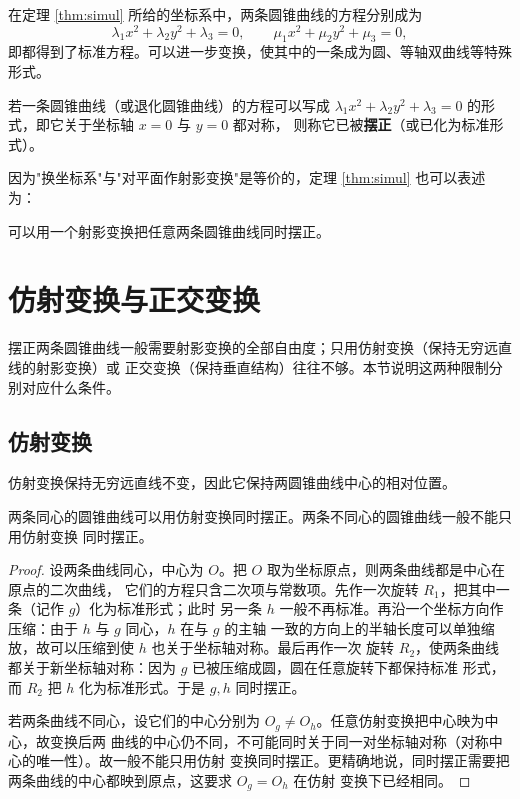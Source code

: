 \begin{corollary}[摆正]
在定理 \ref{thm:simul} 所给的坐标系中，两条圆锥曲线的方程分别成为
\[
\lambda_1x^2+\lambda_2y^2+\lambda_3=0,\qquad
\mu_1x^2+\mu_2y^2+\mu_3=0,
\]
即都得到了标准方程。可以进一步变换，使其中的一条成为圆、等轴双曲线等特殊形式。
\end{corollary}

\begin{definition}
若一条圆锥曲线（或退化圆锥曲线）的方程可以写成
$\lambda_1x^2+\lambda_2y^2+\lambda_3=0$ 的形式，即它关于坐标轴 $x=0$ 与 $y=0$ 都对称，
则称它已被\textbf{摆正}（或已化为标准形式）。
\end{definition}

因为"换坐标系"与"对平面作射影变换"是等价的，定理 \ref{thm:simul} 也可以表述为：

\begin{corollary}
可以用一个射影变换把任意两条圆锥曲线同时摆正。
\end{corollary}

\section{仿射变换与正交变换}

摆正两条圆锥曲线一般需要射影变换的全部自由度；只用仿射变换（保持无穷远直线的射影变换）或
正交变换（保持垂直结构）往往不够。本节说明这两种限制分别对应什么条件。

\subsection{仿射变换}

仿射变换保持无穷远直线不变，因此它保持两圆锥曲线中心的相对位置。

\begin{proposition}
两条同心的圆锥曲线可以用仿射变换同时摆正。两条不同心的圆锥曲线一般不能只用仿射变换
同时摆正。
\end{proposition}

\begin{proof}
设两条曲线同心，中心为 $O$。把 $O$ 取为坐标原点，则两条曲线都是中心在原点的二次曲线，
它们的方程只含二次项与常数项。先作一次旋转 $R_1$，把其中一条（记作 $g$）化为标准形式；此时
另一条 $h$ 一般不再标准。再沿一个坐标方向作压缩：由于 $h$ 与 $g$ 同心，$h$ 在与 $g$ 的主轴
一致的方向上的半轴长度可以单独缩放，故可以压缩到使 $h$ 也关于坐标轴对称。最后再作一次
旋转 $R_2$，使两条曲线都关于新坐标轴对称：因为 $g$ 已被压缩成圆，圆在任意旋转下都保持标准
形式，而 $R_2$ 把 $h$ 化为标准形式。于是 $g,h$ 同时摆正。

若两条曲线不同心，设它们的中心分别为 $O_g\ne O_h$。任意仿射变换把中心映为中心，故变换后两
曲线的中心仍不同，不可能同时关于同一对坐标轴对称（对称中心的唯一性）。故一般不能只用仿射
变换同时摆正。更精确地说，同时摆正需要把两条曲线的中心都映到原点，这要求 $O_g=O_h$ 在仿射
变换下已经相同。
\end{proof}

